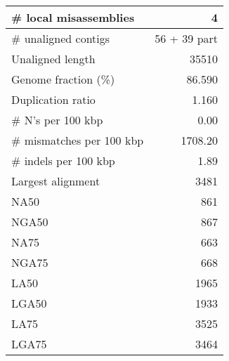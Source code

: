 \documentclass[12pt,a4paper]{article}
\begin{document}
\begin{table}[ht]
\begin{center}
\begin{tabular}{|l*{1}{|r}|}
\# local misassemblies & 4 \\ \hline
\# unaligned contigs & 56 + 39 part \\ \hline
Unaligned length & 35510 \\ \hline
Genome fraction (\%) & 86.590 \\ \hline
Duplication ratio & 1.160 \\ \hline
\# N's per 100 kbp & 0.00 \\ \hline
\# mismatches per 100 kbp & 1708.20 \\ \hline
\# indels per 100 kbp & 1.89 \\ \hline
Largest alignment & 3481 \\ \hline
NA50 & 861 \\ \hline
NGA50 & 867 \\ \hline
NA75 & 663 \\ \hline
NGA75 & 668 \\ \hline
LA50 & 1965 \\ \hline
LGA50 & 1933 \\ \hline
LA75 & 3525 \\ \hline
LGA75 & 3464 \\ \hline
\end{tabular}
\end{center}
\end{table}
\end{document}
